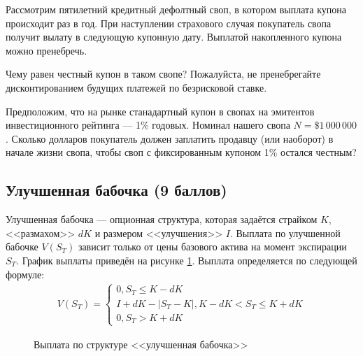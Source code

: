 \documentclass[a4paper,14pt]{extarticle}
\begin{document}
Рассмотрим пятилетний кредитный дефолтный своп, в котором выплата купона происходит раз в год. При наступлении страхового случая покупатель свопа получит вылату в следующую купонную дату. Выплатой накопленного купона можно пренебречь.

Чему равен честный купон в таком свопе? Пожалуйста, не пренебрегайте дисконтированием будущих платежей по безрисковой ставке.

Предположим, что на рынке станадартный купон в свопах на эмитентов инвестиционного рейтинга --- 1\% годовых. Номинал нашего свопа $N=\$1\,000\,000$. Сколько долларов покупатель должен заплатить продавцу (или наоборот) в начале жизни свопа, чтобы своп с фиксированным купоном 1\% остался честным?

\subsection{Улучшенная бабочка (9 баллов)}

Улучшенная бабочка --- опционная структура, которая задаётся страйком $K$, <<размахом>> $dK$ и размером <<улучшения>> $I$. Выплата по улучшенной бабочке $V(S_T)$ зависит только от цены базового актива на момент экспирации $S_T$. График выплаты приведён на рисунке \ref{fly_payoff}. Выплата определяется по следующей формуле:
\begin{align*}
V(S_T) = \begin{cases}0, S_T \le K - dK \\
I + dK - |S_T - K|, K - dK < S_T \le K + dK \\
0, S_T > K + dK
\end{cases}
\end{align*}

\begin{figure}[h]
\centering
{}
\caption{Выплата по структуре <<улучшенная бабочка>>}
\label{fly_payoff}
\end{figure}
\end{document}
